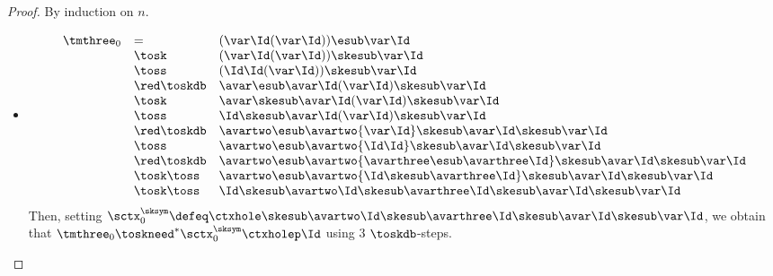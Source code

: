 \begin{proof}
  By induction on $n$.
  \begin{itemize}
    \item {}
     \[\begin{array}{lllll}
	\tmthree_0 
	&= &(\var\Id(\var\Id))\esub\var\Id \\
	&\tosk &(\var\Id(\var\Id))\skesub\var\Id \\
	&\toss &(\Id\Id(\var\Id))\skesub\var\Id \\
	&\red\toskdb &\avar\esub\avar\Id(\var\Id)\skesub\var\Id \\
	&\tosk &\avar\skesub\avar\Id(\var\Id)\skesub\var\Id \\
	&\toss &\Id\skesub\avar\Id(\var\Id)\skesub\var\Id \\
	&\red\toskdb &\avartwo\esub\avartwo{\var\Id}
	\skesub\avar\Id\skesub\var\Id \\
	&\toss &\avartwo\esub\avartwo{\Id\Id}
	\skesub\avar\Id\skesub\var\Id \\
	&\red\toskdb &\avartwo\esub\avartwo{\avarthree\esub\avarthree\Id}
	\skesub\avar\Id\skesub\var\Id \\
	&\tosk\toss& \avartwo\esub\avartwo{\Id\skesub\avarthree\Id}
	\skesub\avar\Id\skesub\var\Id \\
	&\tosk\toss& \Id \skesub\avartwo\Id
	\skesub\avarthree\Id \skesub\avar\Id\skesub\var\Id
      \end{array}\]
      Then, setting $\sctx_0^{\sksym} \defeq \ctxhole\skesub\avartwo\Id
	\skesub\avarthree\Id \skesub\avar\Id\skesub\var\Id$, we obtain that $\tmthree_0 \toskneed^* \sctx_0^{\sksym}\ctxholep\Id$ using $3$ $\toskdb$-steps.


\end{itemize}
\end{proof}

